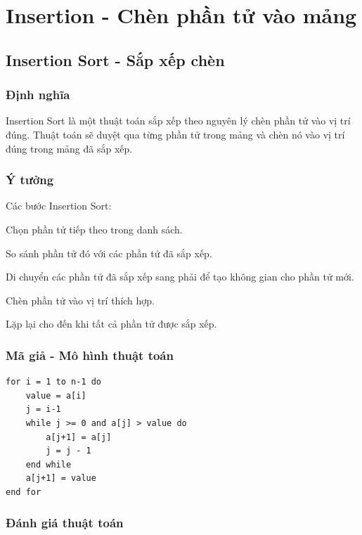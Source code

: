 \documentclass[12pt,a4paper]{report}
\begin{document}
\chapter{ Insertion - Chèn phần tử vào mảng}

\section{ Insertion Sort - Sắp xếp chèn}
 
\subsection{ Định nghĩa}

{\large \hspace{1cm} Insertion Sort là một thuật toán sắp xếp theo nguyên lý chèn phần tử vào vị trí đúng. Thuật toán sẽ duyệt qua từng phần tử trong mảng và chèn nó vào vị trí đúng trong mảng đã sắp xếp.}

\subsection { Ý tưởng}

Các bước Insertion Sort:

Chọn phần tử tiếp theo trong danh sách.

So sánh phần tử đó với các phần tử đã sắp xếp.

Di chuyển các phần tử đã sắp xếp sang phải để tạo không gian cho phần tử mới.

Chèn phần tử vào vị trí thích hợp.

Lặp lại cho đến khi tất cả phần tử được sắp xếp.

\pagebreak

\subsection{ Mã giả - Mô hình thuật toán}

\begin{lstlisting}
for i = 1 to n-1 do
    value = a[i]
    j = i-1
    while j >= 0 and a[j] > value do
        a[j+1] = a[j]
        j = j - 1
    end while
    a[j+1] = value
end for
\end{lstlisting}

\subsection{ Đánh giá thuật toán}
\end{document}
